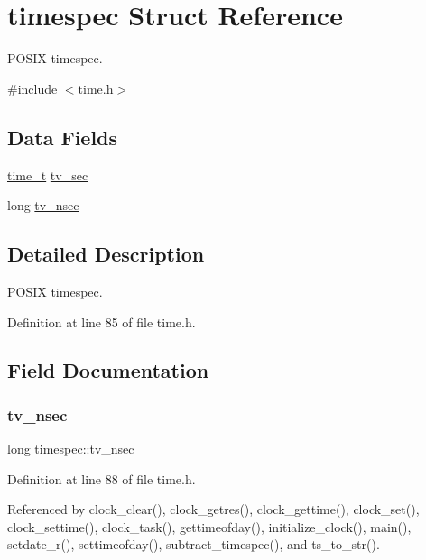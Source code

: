 \hypertarget{structtimespec}{}\section{timespec Struct Reference}
\label{structtimespec}


P\+O\+S\+IX timespec.  




{\ttfamily \#include $<$time.\+h$>$}

\subsection*{Data Fields}
\begin{DoxyCompactItemize}
\item 
\hyperlink{time_8h_a3346b04b0420b32ccf6b706551b70762}{time\+\_\+t} \hyperlink{structtimespec_afc3302668d7cb5952f590da69fdd4955}{tv\+\_\+sec}
\item 
long \hyperlink{structtimespec_ae3c7510dafa8cbcaede866ed13c99683}{tv\+\_\+nsec}
\end{DoxyCompactItemize}


\subsection{Detailed Description}
P\+O\+S\+IX timespec. 

Definition at line 85 of file time.\+h.



\subsection{Field Documentation}
\mbox{\label{structtimespec_ae3c7510dafa8cbcaede866ed13c99683}} 
\subsubsection{\texorpdfstring{tv\+\_\+nsec}{tv\_nsec}}
{\footnotesize\ttfamily long timespec\+::tv\+\_\+nsec}



Definition at line 88 of file time.\+h.



Referenced by clock\+\_\+clear(), clock\+\_\+getres(), clock\+\_\+gettime(), clock\+\_\+set(), clock\+\_\+settime(), clock\+\_\+task(), gettimeofday(), initialize\+\_\+clock(), main(), setdate\+\_\+r(), settimeofday(), subtract\+\_\+timespec(), and ts\+\_\+to\+\_\+str().

